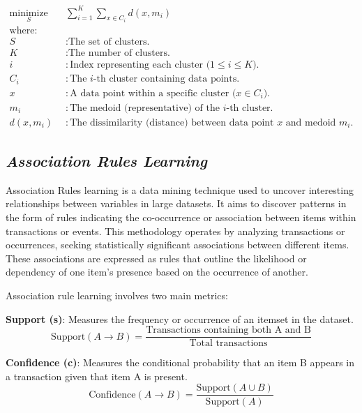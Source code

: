 \begin{equation}\label{eq:k-medoids}
    \begin{aligned}
        \underset{S}{\text{minimize}} \quad & \sum_{i=1}^{K} \sum_{x \in C_i} d(x, m_i) \\
        \text{where:} \\
        S & : \text{The set of clusters.} \\
        K & : \text{The number of clusters.} \\
        i & : \text{Index representing each cluster (\(1 \leq i \leq K\)).} \\
        C_i & : \text{The \(i\)-th cluster containing data points.} \\
        x & : \text{A data point within a specific cluster (\(x \in C_i\)).} \\
        m_i & : \text{The medoid (representative) of the \(i\)-th cluster.} \\
        d(x, m_i) & : \text{The dissimilarity (distance) between data point \(x\) and medoid \(m_i\).}
    \end{aligned}
\end{equation}

\subsection{\textit{Association Rules Learning}}

Association Rules learning is a data mining technique used to uncover interesting relationships between variables in large datasets. It aims to discover patterns in the form of rules indicating the co-occurrence or association between items within transactions or events. This methodology operates by analyzing transactions or occurrences, seeking statistically significant associations between different items. These associations are expressed as rules that outline the likelihood or dependency of one item's presence based on the occurrence of another. 

Association rule learning involves two main metrics:

\textbf{Support (s)}: Measures the frequency or occurrence of an itemset in the dataset.
\[
\text{Support}(A \rightarrow B) = \frac{\text{Transactions containing both A and B}}{\text{Total transactions}}
\]

\textbf{Confidence (c)}: Measures the conditional probability that an item B appears in a transaction given that item A is present.
\[
\text{Confidence}(A \rightarrow B) = \frac{\text{Support}(A \cup B)}{\text{Support}(A)}
\]

